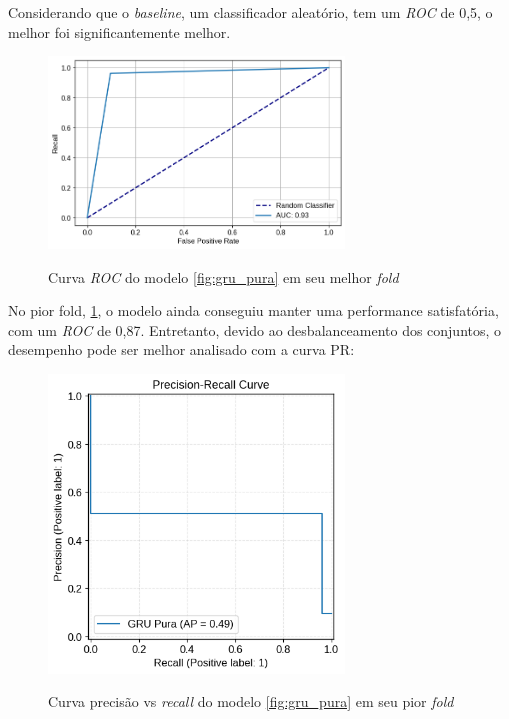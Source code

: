 Considerando que o \textit{baseline}, um classificador aleatório, tem um \textit{ROC} de 0,5, o melhor foi significantemente melhor.

\begin{figure}[H]
  \centering
  \caption{Curva \textit{ROC} do modelo \ref{fig:gru_pura} em seu melhor \textit{fold}}
   \includegraphics[width=0.7\textwidth]{figuras/modelos_resultados/gru/roc_gru_pior_fold.png} %
  \label{fig:roc_pior_fold_gru}
\end{figure}

No pior fold, \ref{fig:roc_pior_fold_gru}, o modelo ainda conseguiu manter uma performance satisfatória, com um \textit{ROC} de 0,87. 
Entretanto, devido ao desbalanceamento dos conjuntos, o desempenho pode ser melhor analisado com a curva PR:

\begin{figure}[H]
  \centering
  \caption{Curva precisão vs \textit{recall} do modelo \ref{fig:gru_pura} em seu pior \textit{fold}}
   \includegraphics[width=0.7\textwidth]{figuras/modelos_resultados/gru/ap_gru_pior_fold.png} %
  \label{fig:ap_gru_pior_fold}
\end{figure}

